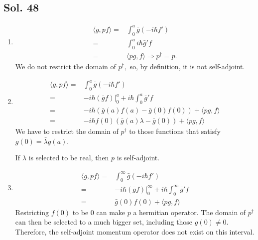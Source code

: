 \subsection*{Sol. 48}
\begin{enumerate}
    \item 
    \begin{align*}
        \langle g, pf\rangle
    =&\int_0^a\bar{g}(-i\hbar f')\\
    =&\int_0^ai\hbar\bar{g}'f\\
    =&\langle pg,f\rangle
    \Rightarrow p^\dagger = p.
    \end{align*}
    We do not restrict the domain of $p^\dagger,$ so, by definition, it is not self-adjoint. 
    \item 
    \begin{align*}
        \langle g, pf\rangle
    =&\int_0^a\bar{g}(-i\hbar f')\\
    =& -i\hbar (\bar{g}f)\bigg|^a_0+i\hbar \int_0^a\bar{g}'f\\
    =&-i\hbar(\bar{g}(a)f(a)-\bar{g}(0)f(0))+\langle pg, f\rangle\\
    =&
    -i\hbar f(0)(\bar{g}(a)\lambda-\bar{g}(0))+\langle pg, f\rangle
    \end{align*}
    We have to restrict the domain of $p^\dagger$ to those functions that satisfy $g(0)=\bar{\lambda}g(a).$

    If $\lambda$ is selected to be real, then $p$ is self-adjoint.
    \item 
    \begin{align*}
        \langle g, pf\rangle
    =&\int_0^\infty\bar{g}(-i\hbar f')\\
    =& -i\hbar (\bar{g}f)\bigg|^\infty_0+i\hbar \int_0^\infty\bar{g}'f\\
    =&\bar{g}(0)f(0) + \langle pg,f\rangle
    \end{align*}
    Restricting $f(0)$ to be 0 can make $p$ a hermitian operator. The domain of $p^\dagger$ can then be selected 
    to a much bigger set, including those $g(0)\neq 0.$ Therefore, the self-adjoint momentum operator does not exist on this interval.
    
\end{enumerate}
